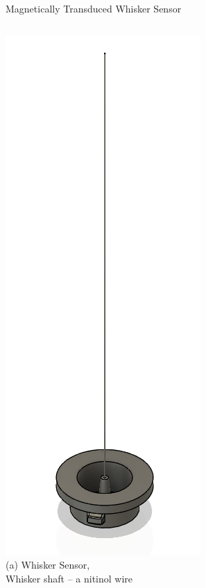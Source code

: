 \documentclass[AIRbeamer
,optEnglish
,optBiber
,optBibstyleAlphabetic
,optBeamerClassicFormat%
]{AIRlatex}
\begin{document}
    \begin{frame}[c]{Magnetically Transduced Whisker Sensor}
        \begin{columns}[c,onlytextwidth]
            \centering
            \includegraphics[height=0.6\textheight]{figures/whisker}\\
            (a) Whisker Sensor,\\Whisker shaft -- a nitinol wire
            \centering

\end{columns}
\end{frame}
\end{document}
